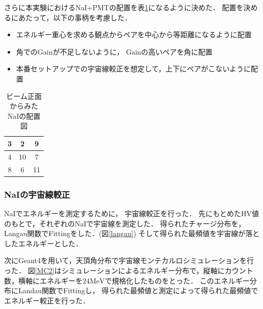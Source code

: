 さらに本実験におけるNaI+PMTの配置を表\ref{haichi}になるように決めた．
配置を決めるにあたって，以下の事柄を考慮した．
\begin{itemize}
\item エネルギー重心を求める観点からペアを中心から等距離になるように配置
\item 角でのGainが不足しないように， Gainの高いペアを角に配置
\item 本番セットアップでの宇宙線較正を想定して，上下にペアがこないように配置
\end{itemize}
\begin{table}[H]
  \begin{center}
    \caption{ビーム正面からみたNaIの配置図}\label{haichi}
    \begin{tabular}{|c|c|c|}\hline 
      \cellcolor{yellow}3&\cellcolor{red}2&\cellcolor{yellow}9\\ \hline
      \cellcolor{cyan}4&10&\cellcolor{red}7\\ \hline
      \cellcolor{green}8&\cellcolor{cyan}6&\cellcolor{green}11\\ \hline
    \end{tabular}
  \end{center}
\end{table}
\newpage
\subsubsection{NaIの宇宙線較正}
NaIでエネルギーを測定するために， 宇宙線較正を行った．
先にもとめたHV値のもとで，それぞれのNaIで宇宙線を測定した．
得られたチャージ分布を，Langau関数でFittingをした．(図\ref{langau})
そして得られた最頻値を宇宙線が落としたエネルギーとした．

次にGeant4を用いて，天頂角分布で宇宙線モンテカルロシミュレーションを行った．
図\ref{MC2}はシミュレーションによるエネルギー分布で，縦軸にカウント数，横軸にエネルギーを$24\mathrm{MeV}$で規格化したものをとった．
このエネルギー分布にLandau関数でFittingし，
得られた最頻値と測定によって得られた最頻値でエネルギー較正を行った．

